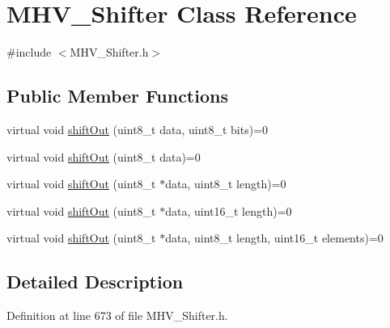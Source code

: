 \hypertarget{class_m_h_v___shifter}{
\section{\-M\-H\-V\-\_\-\-Shifter \-Class \-Reference}
\label{class_m_h_v___shifter}
}


{\ttfamily \#include $<$\-M\-H\-V\-\_\-\-Shifter.\-h$>$}

\subsection*{\-Public \-Member \-Functions}
\begin{DoxyCompactItemize}
\item 
virtual void \hyperlink{class_m_h_v___shifter_a4e0972d0c8471a4f53ba8e683a8436f7}{shift\-Out} (uint8\-\_\-t data, uint8\-\_\-t bits)=0
\item 
virtual void \hyperlink{class_m_h_v___shifter_a6c1cc1bc7adb72bfcc7482e1731898d4}{shift\-Out} (uint8\-\_\-t data)=0
\item 
virtual void \hyperlink{class_m_h_v___shifter_a51636cdb41c763615ec27800275ae4dd}{shift\-Out} (uint8\-\_\-t $\ast$data, uint8\-\_\-t length)=0
\item 
virtual void \hyperlink{class_m_h_v___shifter_a9ee15658e944ba4258121c59a71c30e5}{shift\-Out} (uint8\-\_\-t $\ast$data, uint16\-\_\-t length)=0
\item 
virtual void \hyperlink{class_m_h_v___shifter_aa923b774e68afb5ec9d58a4eac30ab34}{shift\-Out} (uint8\-\_\-t $\ast$data, uint8\-\_\-t length, uint16\-\_\-t elements)=0
\end{DoxyCompactItemize}


\subsection{\-Detailed \-Description}


\-Definition at line 673 of file \-M\-H\-V\-\_\-\-Shifter.\-h.



